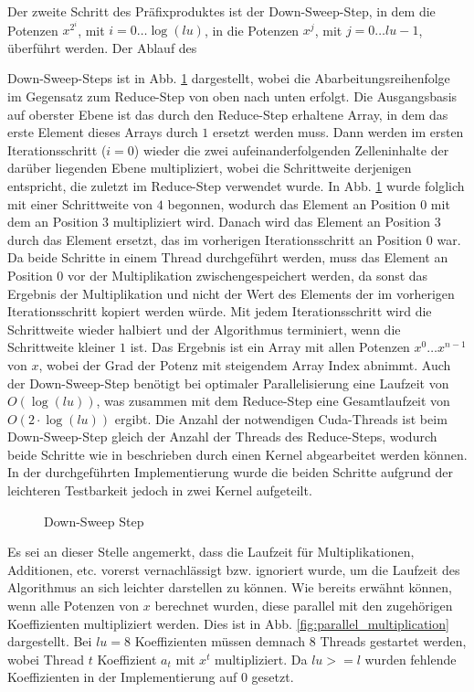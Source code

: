 Der zweite Schritt des Präfixproduktes ist der Down-Sweep-Step, in dem die Potenzen $x^{2^i}$, mit $i=0 \dots \log(lu)$, in die Potenzen $x^j$, mit $j=0 \dots lu-1$, überführt werden. Der Ablauf des {Down-Sweep-Steps ist in Abb. \ref{fig:down_sweep_step} dargestellt, wobei die Abarbeitungsreihenfolge im Gegensatz zum Reduce-Step von oben nach unten erfolgt. Die Ausgangsbasis auf oberster Ebene ist das durch den Reduce-Step erhaltene Array, in dem das erste Element dieses Arrays durch $1$ ersetzt werden muss. Dann werden im ersten Iterationsschritt ($i=0$) wieder die zwei aufeinanderfolgenden Zelleninhalte der darüber liegenden Ebene multipliziert, wobei die Schrittweite derjenigen entspricht, die zuletzt im Reduce-Step verwendet wurde. In Abb. \ref{fig:down_sweep_step} wurde folglich mit einer Schrittweite von $4$ begonnen, wodurch das Element an Position $0$ mit dem an Position $3$ multipliziert wird. Danach wird das Element an Position $3$ durch das Element ersetzt, das im vorherigen Iterationsschritt an Position $0$ war. Da beide Schritte in einem Thread durchgeführt werden, muss das Element an Position $0$ vor der Multiplikation zwischengespeichert werden, da sonst das Ergebnis der Multiplikation und nicht der Wert des Elements der im vorherigen Iterationsschritt kopiert werden würde.
Mit jedem Iterationsschritt wird die Schrittweite wieder halbiert und der Algorithmus terminiert, wenn die Schrittweite kleiner $1$ ist. Das Ergebnis ist ein Array mit allen Potenzen $x^0 \dots x^{n-1}$ von $x$, wobei der Grad der Potenz mit steigendem Array Index abnimmt. Auch der Down-Sweep-Step benötigt bei optimaler Parallelisierung eine Laufzeit von $O(\log(lu))$, was zusammen mit dem Reduce-Step eine Gesamtlaufzeit von $O(2 \cdot \log(lu))$ ergibt. Die Anzahl der notwendigen Cuda-Threads ist beim Down-Sweep-Step gleich der Anzahl der Threads des Reduce-Steps, wodurch beide Schritte wie in \cite{Harris:2014} beschrieben durch einen Kernel abgearbeitet werden können. In der durchgeführten Implementierung wurde die beiden Schritte aufgrund der leichteren Testbarkeit jedoch in zwei Kernel aufgeteilt.\newline

\begin{figure}[!htb]
\centering

\caption{Down-Sweep Step} \label{fig:down_sweep_step}
\end{figure}

Es sei an dieser Stelle angemerkt, dass die Laufzeit für Multiplikationen, Additionen, etc. vorerst vernachlässigt bzw. ignoriert wurde, um die Laufzeit des Algorithmus an sich leichter darstellen zu können.\newline
Wie bereits erwähnt können, wenn alle Potenzen von $x$ berechnet wurden, diese parallel mit den zugehörigen Koeffizienten multipliziert werden. Dies ist in Abb. \ref{fig:parallel_multiplication} dargestellt. Bei $lu = 8$ Koeffizienten müssen demnach 8 Threads gestartet werden, wobei Thread $t$ Koeffizient $a_t$ mit $x^t$ multipliziert. Da $lu >= l$ wurden fehlende Koeffizienten in der Implementierung auf 0 gesetzt.

}
